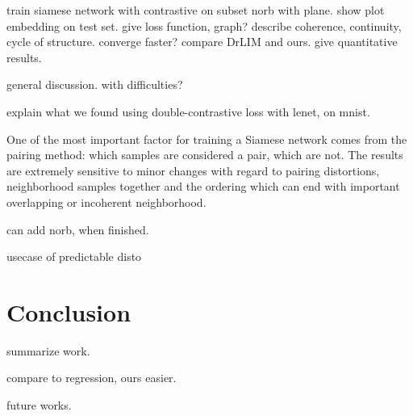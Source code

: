 \documentclass[a4paper,12pt]{report}
\begin{document}
train siamese network with contrastive on subset norb with plane.
show plot embedding on test set.
give loss function, graph?
describe coherence, continuity, cycle of structure.
converge faster?
compare DrLIM and ours.
give quantitative results.

general discussion.
with difficulties?

explain what we found using double-contrastive loss with lenet, on mnist.

One of the most important factor for training a Siamese network comes from the pairing method: which samples are considered a pair, which are not.
The results are extremely sensitive to minor changes with regard to pairing distortions, neighborhood samples together and the ordering which can end with important overlapping or incoherent neighborhood.

can add norb, when finished.

usecase of predictable disto


\chapter{Conclusion}

summarize work.

compare to regression, ours easier.

future works.

{}


\nocite{lecun2004learning}
\end{document}

